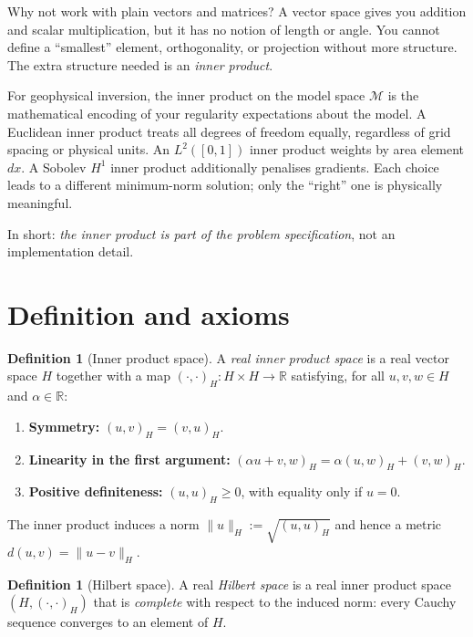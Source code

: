 \documentclass[11pt,twoside,openright]{book}
\theoremstyle{plain}
\theoremstyle{definition}
\newtheorem{definition}[theorem]{Definition}
\theoremstyle{remark}
\newcommand{\modelspace}{\mathcal{M}}
\begin{document}
Why not work with plain vectors and matrices? A vector space gives you
addition and scalar multiplication, but it has no notion of length or
angle. You cannot define a ``smallest'' element, orthogonality, or
projection without more structure. The extra structure needed is an
\emph{inner product}.

For geophysical inversion, the inner product on the model space $\modelspace$
is the mathematical encoding of your regularity expectations about the
model. A Euclidean inner product treats all degrees of freedom equally,
regardless of grid spacing or physical units. An $L^2([0,1])$ inner
product weights by area element $dx$. A Sobolev $H^1$ inner product
additionally penalises gradients. Each choice leads to a different
minimum-norm solution; only the ``right'' one is physically meaningful.

In short: \emph{the inner product is part of the problem specification},
not an implementation detail.

\section{Definition and axioms}
\label{sec:hilbert-definition}

\begin{definition}[Inner product space]
\label{def:inner-product-space}
A \emph{real inner product space} is a real vector space $H$ together with
a map $(\cdot,\cdot)_H : H \times H \to \mathbb{R}$ satisfying, for all
$u, v, w \in H$ and $\alpha \in \mathbb{R}$:
\begin{enumerate}
  \item \textbf{Symmetry:} $(u, v)_H = (v, u)_H$.
  \item \textbf{Linearity in the first argument:}
    $(\alpha u + v, w)_H = \alpha(u, w)_H + (v, w)_H$.
  \item \textbf{Positive definiteness:} $(u, u)_H \geq 0$, with equality only
    if $u = 0$.
\end{enumerate}
\end{definition}

The inner product induces a norm $\|u\|_H := \sqrt{(u, u)_H}$ and hence a
metric $d(u, v) = \|u - v\|_H$.

\begin{definition}[Hilbert space]
\label{def:hilbert-space}
A real \emph{Hilbert space} is a real inner product space $(H, (\cdot,\cdot)_H)$
that is \emph{complete} with respect to the induced norm: every Cauchy
sequence converges to an element of $H$.
\end{definition}
\end{document}
